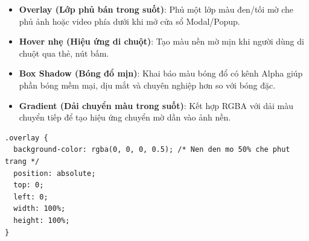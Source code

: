 \documentclass[11pt,oneside]{book}
\begin{document}
\begin{conceptBox}
\begin{itemize}[leftmargin=1.5em, itemsep=3pt, parsep=0pt]
    \item \textbf{Overlay (Lớp phủ bán trong suốt)}: Phủ một lớp màu đen/tối mờ che phủ ảnh hoặc video phía dưới khi mở cửa sổ Modal/Popup.
    \item \textbf{Hover nhẹ (Hiệu ứng di chuột)}: Tạo màu nền mờ mịn khi người dùng di chuột qua thẻ, nút bấm.
    \item \textbf{Box Shadow (Bóng đổ mịn)}: Khai báo màu bóng đổ có kênh Alpha giúp phần bóng mềm mại, dịu mắt và chuyên nghiệp hơn so với bóng đặc.
    \item \textbf{Gradient (Dải chuyển màu trong suốt)}: Kết hợp RGBA với dải màu chuyển tiếp để tạo hiệu ứng chuyển mờ dần vào ảnh nền.
\end{itemize}
\end{conceptBox}

\begin{codeWindow}
\begin{lstlisting}[language=CSS3]
.overlay {
  background-color: rgba(0, 0, 0, 0.5); /* Nen den mo 50% che phut trang */
  position: absolute;
  top: 0;
  left: 0;
  width: 100%;
  height: 100%;
}
\end{lstlisting}
\end{codeWindow}
\end{document}
